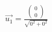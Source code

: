 \documentclass[preview]{standalone}
\begin{document}
\begin{align*}
\vec{u_1} = \frac{\begin{pmatrix} 0 \\ 0 \end{pmatrix}}{\sqrt{0^2 + 0^2}}
\end{align*}
\end{document}
